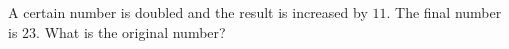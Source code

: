 A certain number is doubled and the result is increased by $11$. The final number is $23$. What is the original number?
